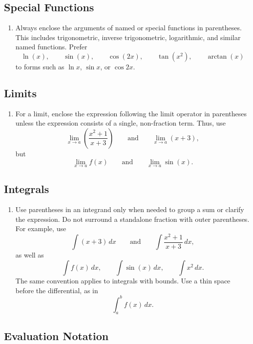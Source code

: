 \documentclass[document,notitlepage]{mhdocument}
\begin{document}
\subsection{Special Functions}

\begin{enumerate}[resume]
\item Always enclose the arguments of named or special functions in parentheses. This includes trigonometric, inverse trigonometric, logarithmic, and similar named functions. Prefer
\[
\ln(x),\qquad \sin(x),\qquad \cos(2x),\qquad \tan(x^2),\qquad \arctan(x)
\]
to forms such as \(\ln x\), \(\sin x\), or \(\cos 2x\).
\end{enumerate}

\subsection{Limits}

\begin{enumerate}[resume]
\item For a limit, enclose the expression following the limit operator in parentheses unless the expression consists of a single, non-fraction term. Thus, use
\[
\lim_{x\to a}\left(\frac{x^2+1}{x+3}\right)
\qquad\text{and}\qquad
\lim_{x\to a}(x+3),
\]
but
\[
\lim_{x\to a}f(x)
\qquad\text{and}\qquad
\lim_{x\to a}\sin(x).
\]
\end{enumerate}

\subsection{Integrals}

\begin{enumerate}[resume]
\item Use parentheses in an integrand only when needed to group a sum or clarify the expression. Do not surround a standalone fraction with outer parentheses. For example, use
\[
\int (x+3)\,dx
\qquad\text{and}\qquad
\int \frac{x^2+1}{x+3}\,dx,
\]
as well as
\[
\int f(x)\,dx,\qquad
\int \sin(x)\,dx,\qquad
\int x^2\,dx.
\]
The same convention applies to integrals with bounds. Use a thin space before the differential, as in
\[
\int_a^b f(x)\,dx.
\]
\end{enumerate}

\subsection{Evaluation Notation}
\end{document}
